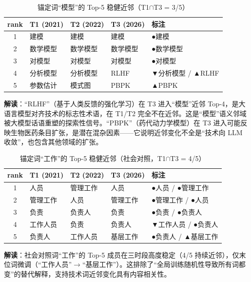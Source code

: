 \documentclass[12pt,a4paper]{article}
\begin{document}
\begin{longtable}{|c|p{2.4cm}|p{2.4cm}|p{2.4cm}|p{4.5cm}|}
\caption{锚定词“模型”的 Top-5 稳健近邻（T1$\cap$T3 = 3/5）} \\
\hline
\textbf{rank} & \textbf{T1 (2021)} & \textbf{T2 (2022)} & \textbf{T3 (2026)} & \textbf{标注} \\
\hline
1 & 建模 & 建模 & 建模 & ●建模 \\
\hline
2 & 数学模型 & 数学模型 & 数学模型 & ●数学模型 \\
\hline
3 & 对模型 & 对模型 & 对模型 & ●对模型 \\
\hline
4 & 分析模型 & 分析模型 & RLHF & ▼分析模型 / ▲RLHF \\
\hline
5 & 参数估计 & 模式图 & PBPK & ▲PBPK \\
\hline
\end{longtable}

\textbf{解读}：“RLHF”（基于人类反馈的强化学习）在 T3 进入“模型”近邻 Top-4，是大语言模型对齐技术的标志性术语，在 T1/T2 完全不在近邻。这是“模型”语义邻域被大模型话语重塑的探索性信号。“PBPK”（药代动力学模型）在 T3 进入可能反映生物医药条目扩张，是潜在混杂因素——它说明近邻变化不全是“技术向 LLM 收敛”，也包含其他领域的扩张。

\begin{longtable}{|c|p{2.4cm}|p{2.4cm}|p{2.4cm}|p{4.5cm}|}
\caption{锚定词“工作”的 Top-5 稳健近邻（社会对照，T1$\cap$T3 = 4/5）} \\
\hline
\textbf{rank} & \textbf{T1 (2021)} & \textbf{T2 (2022)} & \textbf{T3 (2026)} & \textbf{标注} \\
\hline
1 & 人员 & 管理工作 & 人员 & ●人员 / ●管理工作 \\
\hline
2 & 管理工作 & 人员 & 管理工作 & ●管理工作 / ●人员 \\
\hline
3 & 负责 & 负责人 & 负责 & ●负责 / ●负责人 \\
\hline
4 & 工作人员 & 负责 & 负责人 & ▼工作人员 / ●负责人 \\
\hline
5 & 负责人 & 工作人员 & 基层工作 & ●负责人 / ▲基层工作 \\
\hline
\end{longtable}

\textbf{解读}：社会对照词“工作”的 Top-5 成员在三时段高度稳定（4/5 持续近邻），仅末位词微调（“工作人员”$\rightarrow$“基层工作”）。这排除了“全局训练随机性导致所有词都变”的替代解释，支持技术词近邻变化具有内容相关性。
\end{document}
